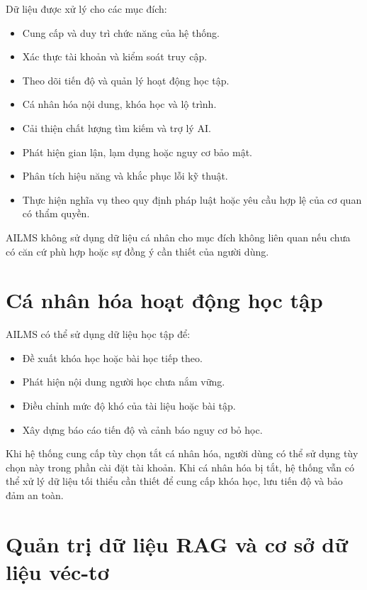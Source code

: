 \documentclass[12pt,a4paper]{article}
\begin{document}
Dữ liệu được xử lý cho các mục đích:

\begin{itemize}
    \item Cung cấp và duy trì chức năng của hệ thống.
    \item Xác thực tài khoản và kiểm soát truy cập.
    \item Theo dõi tiến độ và quản lý hoạt động học tập.
    \item Cá nhân hóa nội dung, khóa học và lộ trình.
    \item Cải thiện chất lượng tìm kiếm và trợ lý AI.
    \item Phát hiện gian lận, lạm dụng hoặc nguy cơ bảo mật.
    \item Phân tích hiệu năng và khắc phục lỗi kỹ thuật.
    \item Thực hiện nghĩa vụ theo quy định pháp luật hoặc yêu cầu hợp lệ của cơ quan có thẩm quyền.
\end{itemize}

AILMS không sử dụng dữ liệu cá nhân cho mục đích không liên quan nếu chưa có
căn cứ phù hợp hoặc sự đồng ý cần thiết của người dùng.

\section{Cá nhân hóa hoạt động học tập}

AILMS có thể sử dụng dữ liệu học tập để:

\begin{itemize}
    \item Đề xuất khóa học hoặc bài học tiếp theo.
    \item Phát hiện nội dung người học chưa nắm vững.
    \item Điều chỉnh mức độ khó của tài liệu hoặc bài tập.
    \item Xây dựng báo cáo tiến độ và cảnh báo nguy cơ bỏ học.
\end{itemize}

Khi hệ thống cung cấp tùy chọn tắt cá nhân hóa, người dùng có thể sử dụng tùy chọn này
trong phần cài đặt tài khoản. Khi cá nhân hóa bị tắt, hệ thống vẫn có thể xử lý dữ liệu
tối thiểu cần thiết để cung cấp khóa học, lưu tiến độ và bảo đảm an toàn.

\section{Quản trị dữ liệu RAG và cơ sở dữ liệu véc-tơ}
\end{document}
